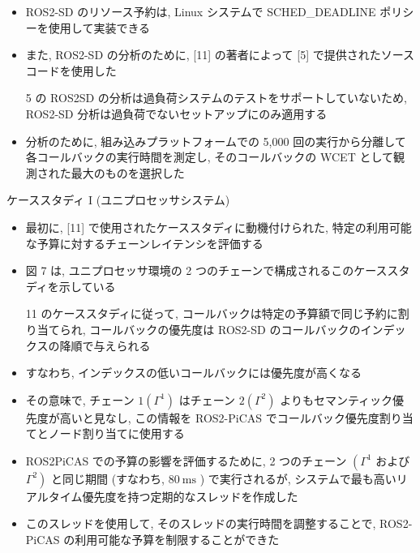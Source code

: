 \begin{frame}{}
    \begin{itemize}
        \item ROS2-SD のリソース予約は, Linux システムで SCHED\_DEADLINE ポリシーを使用して実装できる
\item また, ROS2-SD の分析のために, [11] の著者によって [5] で提供されたソースコードを使用した
\item [5] の ROS2SD の分析は過負荷システムのテストをサポートしていないため, ROS2-SD 分析は過負荷でないセットアップにのみ適用する
\item 分析のために, 組み込みプラットフォームでの 5,000 回の実行から分離して各コールバックの実行時間を測定し, そのコールバックの WCET として観測された最大のものを選択した
    \end{itemize}
\end{frame}

\begin{frame}{ケーススタディ I (ユニプロセッサシステム)}
    \begin{itemize}
        \item 最初に, [11] で使用されたケーススタディに動機付けられた, 特定の利用可能な予算に対するチェーンレイテンシを評価する
\item 図 7 は, ユニプロセッサ環境の 2 つのチェーンで構成されるこのケーススタディを示している
\item [11] のケーススタディに従って, コールバックは特定の予算額で同じ予約に割り当てられ, コールバックの優先度は ROS2-SD のコールバックのインデックスの降順で与えられる
\item すなわち, インデックスの低いコールバックには優先度が高くなる
\item その意味で, チェーン $1\left(\Gamma^{1}\right)$ はチェーン $2\left(\Gamma^{2}\right)$ よりもセマンティック優先度が高いと見なし, この情報を ROS2-PiCAS でコールバック優先度割り当てとノード割り当てに使用する
\item ROS2PiCAS での予算の影響を評価するために, 2 つのチェーン $\left(\Gamma^{1}\right.$ および $\left.\Gamma^{2}\right)$ と同じ期間 (すなわち,  $80 \mathrm{~ms}$ ) で実行されるが, システムで最も高いリアルタイム優先度を持つ定期的なスレッドを作成した
\item このスレッドを使用して, そのスレッドの実行時間を調整することで, ROS2-PiCAS の利用可能な予算を制限することができた
    \end{itemize}
\end{frame}

